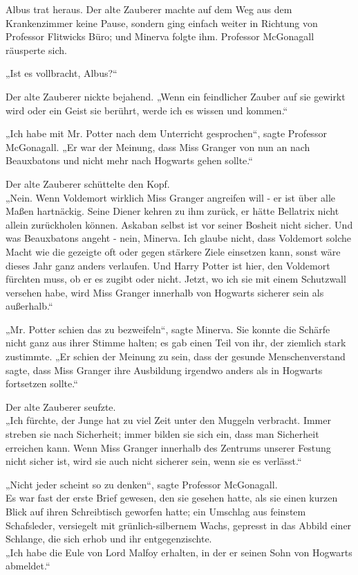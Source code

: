 {Albus trat heraus. Der alte Zauberer machte auf dem Weg aus dem Krankenzimmer keine Pause, sondern ging einfach weiter in Richtung von Professor Flitwicks Büro; und Minerva folgte ihm. Professor McGonagall räusperte sich.

„Ist es vollbracht, Albus?“

Der alte Zauberer nickte bejahend. „Wenn ein feindlicher Zauber auf sie gewirkt wird oder ein Geist sie berührt, werde ich es wissen und kommen.“

„Ich habe mit Mr. Potter nach dem Unterricht gesprochen“, sagte Professor McGonagall. „Er war der Meinung, dass Miss Granger von nun an nach Beauxbatons und nicht mehr nach Hogwarts gehen sollte.“

Der alte Zauberer schüttelte den Kopf.\\ „Nein. Wenn Voldemort wirklich Miss Granger angreifen will - er ist über alle Maßen hartnäckig. Seine Diener kehren zu ihm zurück, er hätte Bellatrix nicht allein zurückholen können. Askaban selbst ist vor seiner Bosheit nicht sicher. Und was Beauxbatons angeht - nein, Minerva. Ich glaube nicht, dass Voldemort solche Macht wie die gezeigte oft oder gegen stärkere Ziele einsetzen kann, sonst wäre dieses Jahr ganz anders verlaufen. Und Harry Potter ist hier, den Voldemort fürchten muss, ob er es zugibt oder nicht. Jetzt, wo ich sie mit einem Schutzwall versehen habe, wird Miss Granger innerhalb von Hogwarts sicherer sein als außerhalb.“

„Mr. Potter schien das zu bezweifeln“, sagte Minerva. Sie konnte die Schärfe nicht ganz aus ihrer Stimme halten; es gab einen Teil von ihr, der ziemlich stark zustimmte. „Er schien der Meinung zu sein, dass der gesunde Menschenverstand sagte, dass Miss Granger ihre Ausbildung irgendwo anders als in Hogwarts fortsetzen sollte.“

Der alte Zauberer seufzte.\\ „Ich fürchte, der Junge hat zu viel Zeit unter den Muggeln verbracht. Immer streben sie nach Sicherheit; immer bilden sie sich ein, dass man Sicherheit erreichen kann. Wenn Miss Granger innerhalb des Zentrums unserer Festung nicht sicher ist, wird sie auch nicht sicherer sein, wenn sie es verlässt.“

„Nicht jeder scheint so zu denken“, sagte Professor McGonagall.\\ Es war fast der erste Brief gewesen, den sie gesehen hatte, als sie einen kurzen Blick auf ihren Schreibtisch geworfen hatte; ein Umschlag aus feinstem Schafsleder, versiegelt mit grünlich-silbernem Wachs, gepresst in das Abbild einer Schlange, die sich erhob und ihr entgegenzischte.\\ „Ich habe die Eule von Lord Malfoy erhalten, in der er seinen Sohn von Hogwarts abmeldet.“

}

